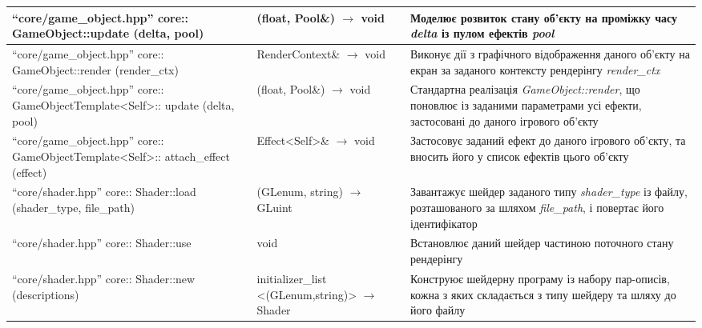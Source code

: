 {\begin{longtable}{| C{6cm} | C{4cm} | C{5cm} |}
    \hline
    ``core/game_object.hpp'' \newline core:: \newline
    GameObject::update \newline (delta, pool)
    & (float, Pool\&) $\to$ void
    & Моделює розвиток стану об'єкту на проміжку часу
    \emph{delta} із пулом ефектів \emph{pool} \\
    \hline
    ``core/game_object.hpp'' \newline core:: \newline
    GameObject::render \newline (render_ctx)
    & RenderContext\& $\to$ void
    & Виконує дії з графічного відображення даного об'єкту на екран
      за заданого контексту рендерінгу \emph{render_ctx} \\
    \hline
    ``core/game_object.hpp'' \newline core:: \newline
    GameObjectTemplate<Self>:: \newline update \newline (delta, pool)
    & (float, Pool\&) $\to$ void
    & Стандартна реалізація \emph{GameObject::render},
    що поновлює із заданими параметрами усі ефекти,
    застосовані до даного ігрового об'єкту \\
    \hline
    ``core/game_object.hpp'' \newline core:: \newline
    GameObjectTemplate<Self>:: \newline attach_effect \newline (effect)
    & Effect<Self>\& $\to$ void
    & Застосовує заданий ефект до даного ігрового об'єкту,
    та вносить його у список ефектів цього об'єкту \\

    \hline
    ``core/shader.hpp'' \newline core:: \newline
    Shader::load \newline (shader_type, file_path)
    & (GLenum, string) $\to$ GLuint
    & Завантажує шейдер заданого типу \emph{shader_type} із файлу,
    розташованого за шляхом \emph{file_path}, і повертає його ідентифікатор \\
    \hline
    ``core/shader.hpp'' \newline core:: \newline
    Shader::use
    & void
    & Встановлює даний шейдер частиною поточного стану рендерінгу \\
    \hline
    ``core/shader.hpp'' \newline core:: \newline
    Shader::new \newline (descriptions)
    & initializer_list \newline <(GLenum,string)> \newline $\to$ Shader
    & Конструює шейдерну програму із набору пар-описів, кожна з яких
    складається з типу шейдеру та шляху до його файлу \\


\end{longtable}}
